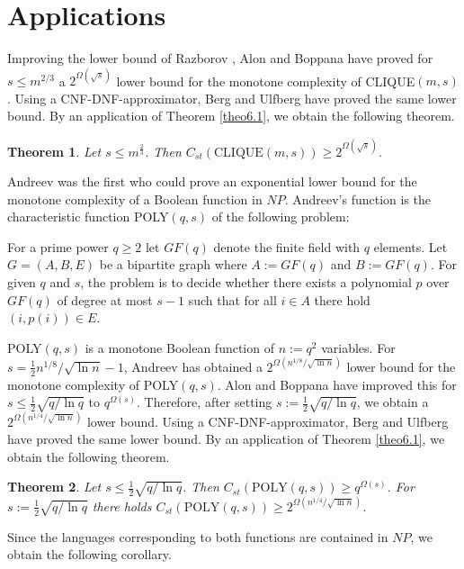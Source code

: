 \documentclass[11pt]{article}
\newtheorem{theo}{Theorem}
\begin{document}
\section{Applications}

Improving the lower bound of Razborov \cite{Ra1}, Alon and Boppana \cite{AlBo} have proved for
$s \leq m^{2/3}$ a $2^{\Omega(\sqrt{s})}$ lower bound for the monotone complexity of CLIQUE$(m,s)$.
Using a CNF-DNF-approximator, Berg and Ulfberg \cite{BeUl} have proved the same lower bound.
By an application of Theorem \ref{theo6.1}, we obtain the following theorem.

\begin{theo}
  Let $s \leq m^{\frac{2}{3}}$. Then $C_{st}(\mbox{CLIQUE}(m,s)) \geq 2^{\Omega(\sqrt{s})}$.
\end{theo}

Andreev \cite{An} was the first who could prove an exponential lower bound for the monotone
complexity of a Boolean function in $NP$. Andreev's function is the characteristic function POLY$(q,s)$ of
the following problem:

For a prime power $q \geq 2$ let $GF(q)$ denote the finite field with $q$ elements. Let $G = (A,B,E)$
be a bipartite graph where $A := GF(q)$ and $B := GF(q)$. For given $q$ and $s$, the problem is to decide
whether there exists a polynomial $p$ over $GF(q)$ of degree at most $s-1$ such that for all
$i \in A$ there hold $(i,p(i)) \in E$.

POLY$(q,s)$ is a monotone Boolean function of $n := q^2$ variables.
For $s = \frac{1}{2} n^{1/8}/\sqrt{\ln n} - 1$, Andreev has obtained a $2^{\Omega(n^{1 /8}/\sqrt{\ln n})}$
lower bound for the monotone complexity of POLY$(q,s)$. Alon and Boppana \cite{AlBo} have improved
this for $s \leq \frac{1}{2} \sqrt{q/\ln q}$ to $q^{\Omega(s)}$. Therefore, after setting
$s := \frac{1}{2} \sqrt{q/\ln q}$, we obtain a $2^{\Omega(n^{1/4}/\sqrt{\ln n})}$ lower bound.
Using a CNF-DNF-approximator, Berg and Ulfberg \cite{BeUl} have proved the same lower bound.
By an application of Theorem \ref{theo6.1}, we obtain the following theorem.

\begin{theo}
  Let $s \leq \frac{1}{2} \sqrt{q/\ln q}$. Then $C_{st}(\mbox{POLY}(q,s)) \geq q^{\Omega(s)}$.
  For $s := \frac{1}{2} \sqrt{q/\ln q}$ there holds $C_{st}(\mbox{POLY}(q,s)) \geq 2^{\Omega(n^{1/4}/\sqrt{\ln n})}$.
\end{theo}

Since the languages corresponding to both functions are contained in $NP$, we obtain the following corollary.
\end{document}
